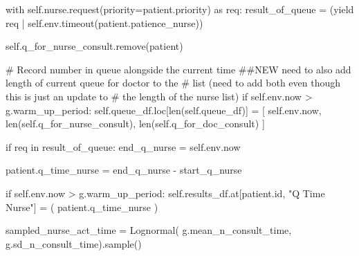 \documentclass[
  letterpaper,
  DIV=11,
  numbers=noendperiod]{scrreprt}
\newenvironment{Shaded}{\begin{snugshade}}{\end{snugshade}}
\newcommand{\BuiltInTok}[1]{\textcolor[rgb]{0.00,0.23,0.31}{#1}}
\newcommand{\CommentTok}[1]{\textcolor[rgb]{0.37,0.37,0.37}{#1}}
\newcommand{\ControlFlowTok}[1]{\textcolor[rgb]{0.00,0.23,0.31}{#1}}
\newcommand{\ImportTok}[1]{\textcolor[rgb]{0.00,0.46,0.62}{#1}}
\newcommand{\KeywordTok}[1]{\textcolor[rgb]{0.00,0.23,0.31}{#1}}
\newcommand{\NormalTok}[1]{\textcolor[rgb]{0.00,0.23,0.31}{#1}}
\newcommand{\OperatorTok}[1]{\textcolor[rgb]{0.37,0.37,0.37}{#1}}
\newcommand{\StringTok}[1]{\textcolor[rgb]{0.13,0.47,0.30}{#1}}
\newcommand{\VariableTok}[1]{\textcolor[rgb]{0.07,0.07,0.07}{#1}}
\begin{document}
\begin{tcolorbox}
\begin{Shaded}
\begin{Highlighting}[]
            \ControlFlowTok{with} \VariableTok{self}\NormalTok{.nurse.request(priority}\OperatorTok{=}\NormalTok{patient.priority) }\ImportTok{as}\NormalTok{ req:}
\NormalTok{                result\_of\_queue }\OperatorTok{=}\NormalTok{ (}\ControlFlowTok{yield}\NormalTok{ req }\OperatorTok{|}
                                \VariableTok{self}\NormalTok{.env.timeout(patient.patience\_nurse))}

                \VariableTok{self}\NormalTok{.q\_for\_nurse\_consult.remove(patient)}

                \CommentTok{\# Record number in queue alongside the current time}
                \CommentTok{\#\#NEW need to also add length of current queue for doctor to the}
                \CommentTok{\# list (need to add both even though this is just an update to}
                \CommentTok{\# the length of the nurse list)}
                \ControlFlowTok{if} \VariableTok{self}\NormalTok{.env.now }\OperatorTok{\textgreater{}}\NormalTok{ g.warm\_up\_period:}
                    \VariableTok{self}\NormalTok{.queue\_df.loc[}\BuiltInTok{len}\NormalTok{(}\VariableTok{self}\NormalTok{.queue\_df)] }\OperatorTok{=}\NormalTok{ [}
                        \VariableTok{self}\NormalTok{.env.now,}
                        \BuiltInTok{len}\NormalTok{(}\VariableTok{self}\NormalTok{.q\_for\_nurse\_consult),}
                        \BuiltInTok{len}\NormalTok{(}\VariableTok{self}\NormalTok{.q\_for\_doc\_consult)}
\NormalTok{                    ]}

                \ControlFlowTok{if}\NormalTok{ req }\KeywordTok{in}\NormalTok{ result\_of\_queue:}
\NormalTok{                    end\_q\_nurse }\OperatorTok{=} \VariableTok{self}\NormalTok{.env.now}

\NormalTok{                    patient.q\_time\_nurse }\OperatorTok{=}\NormalTok{ end\_q\_nurse }\OperatorTok{{-}}\NormalTok{ start\_q\_nurse}

                    \ControlFlowTok{if} \VariableTok{self}\NormalTok{.env.now }\OperatorTok{\textgreater{}}\NormalTok{ g.warm\_up\_period:}
                        \VariableTok{self}\NormalTok{.results\_df.at[patient.}\BuiltInTok{id}\NormalTok{, }\StringTok{"Q Time Nurse"}\NormalTok{] }\OperatorTok{=}\NormalTok{ (}
\NormalTok{                            patient.q\_time\_nurse}
\NormalTok{                        )}

\NormalTok{                    sampled\_nurse\_act\_time }\OperatorTok{=}\NormalTok{ Lognormal(}
\NormalTok{                        g.mean\_n\_consult\_time, g.sd\_n\_consult\_time).sample()}


\end{Highlighting}
\end{Shaded}
\end{tcolorbox}
\end{document}
